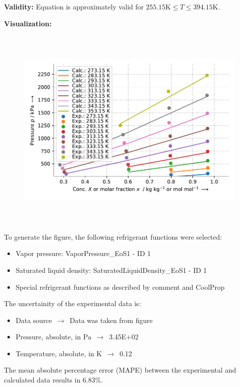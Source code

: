 \textbf{Validity:}
\newline
Equation is approximately valid for $255.15 \si{\kelvin} \leq T \leq 394.15 \si{\kelvin}$.
\newline

\textbf{Visualization:}
%
\begin{figure}[!htp]
{\noindent\includegraphics[height=10cm, keepaspectratio]{figs/abs/abs_R-12_paraffinic__Heil_1.pdf}}
\end{figure}
%

To generate the figure, the following refrigerant functions were selected:
\begin{itemize}
\item Vapor pressure: VaporPressure\_EoS1 - ID 1
\item Saturated liquid density: SaturatedLiquidDensity\_EoS1 - ID 1
\item Special refrigerant functions as described by comment and CoolProp
\end{itemize}

The uncertainity of the experimental data is:
\begin{itemize}
\item Data source $\,\to\,$ Data was taken from figure
\item Pressure, absolute, in $\si{\pascal}$ $\,\to\,$ 3.45E+02
\item Temperature, absolute, in $\si{\kelvin}$ $\,\to\,$ 0.12
\end{itemize}

The mean absolute percentage error (MAPE) between the experimental and calculated data results in 6.83\%.
\FloatBarrier
\newpage
